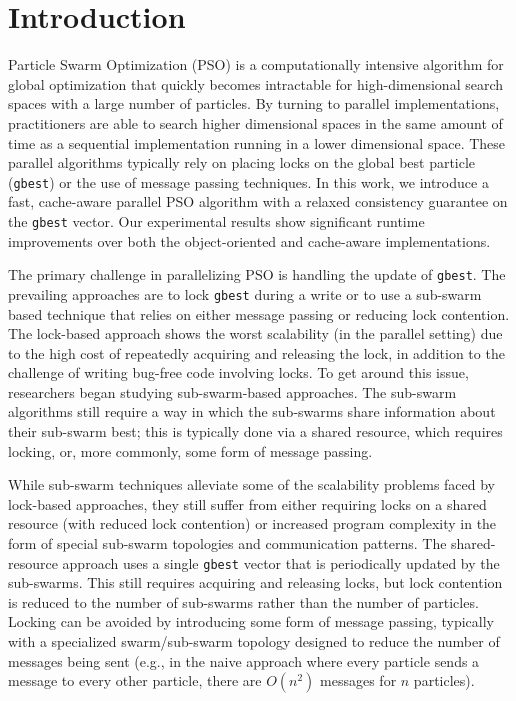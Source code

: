 \section{Introduction}
Particle Swarm Optimization (PSO)\cite{pso} is a computationally intensive algorithm for
global optimization that quickly becomes intractable for
high-dimensional search spaces with a large number of particles.
By turning to parallel implementations, practitioners are able to search higher
dimensional spaces in the same amount of time as a sequential implementation
running in a lower dimensional space.
These parallel algorithms typically rely on placing locks on the global best
particle (\texttt{gbest}) or the use of message passing techniques. In this
work, we introduce a fast, cache-aware parallel PSO algorithm with a relaxed
consistency guarantee on the \texttt{gbest} vector. Our experimental results
show significant
runtime improvements over both the object-oriented and cache-aware implementations.

The primary challenge in parallelizing PSO is handling the update of
\texttt{gbest}. The prevailing approaches are to lock \texttt{gbest} during a
write or to use a sub-swarm based technique that relies on either message
passing or reducing lock contention. The lock-based approach shows the
worst scalability (in the parallel setting) due to the high cost of repeatedly
acquiring and releasing the lock, in addition to the challenge of writing
bug-free code involving locks. To get around this issue, researchers began
studying sub-swarm-based approaches. The sub-swarm algorithms still require a
way in which the sub-swarms share information about their sub-swarm best; this
is typically done via a shared resource, which requires locking, or, more
commonly, some form of message passing.

While sub-swarm techniques alleviate some of the scalability problems
faced by
lock-based approaches, they still suffer from either requiring locks on a shared
resource (with reduced lock contention)
or increased program complexity in the form of special sub-swarm topologies
and communication patterns. The shared-resource approach uses a
single \texttt{gbest} vector that is periodically updated by the sub-swarms.
This still requires acquiring and releasing locks, but lock contention is
reduced to the number of sub-swarms rather than the number of particles.
Locking can be avoided by introducing some
form of message passing, typically with a specialized swarm/sub-swarm topology
designed to reduce the number of messages being sent (e.g., in the naive
approach where every particle sends a message to every other particle, there are
$O(n^2)$ messages for $n$ particles).

